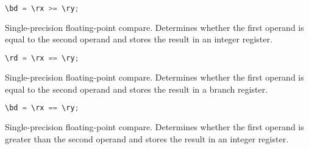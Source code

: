 \begin{lstlisting}[numbers=none, basicstyle=\ttfamily\footnotesize, language=C++]
\bd = \rx >= \ry;
\end{lstlisting}

%

%

Single-precision floating-point compare. Determines whether the first operand is equal to the second operand and stores
the result in an integer register.

\begin{lstlisting}[numbers=none, basicstyle=\ttfamily\footnotesize, language=C++]
\rd = \rx == \ry;
\end{lstlisting}

Single-precision floating-point compare. Determines whether the first operand is equal to the second operand and stores
the result in a branch register.

\begin{lstlisting}[numbers=none, basicstyle=\ttfamily\footnotesize, language=C++]
\bd = \rx == \ry;
\end{lstlisting}

Single-precision floating-point compare. Determines whether the first operand is greater than the second operand and stores
the result in an integer register.

